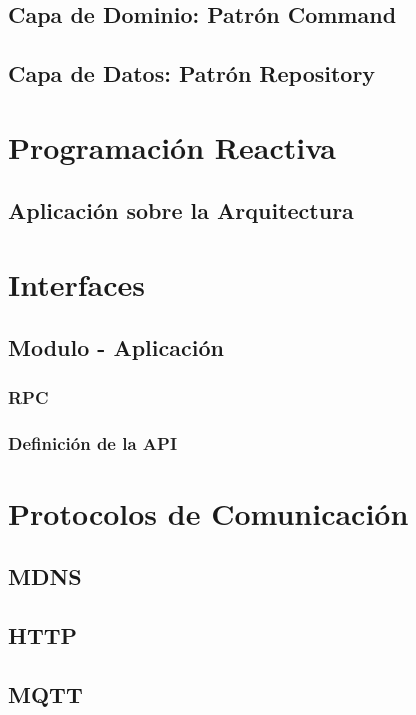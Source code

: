 \subsection{Capa de Dominio: Patrón Command}
\subsection{Capa de Datos: Patrón Repository}

\section{Programación Reactiva}
\subsection{Aplicación sobre la Arquitectura}

\section{Interfaces}
\subsection{Modulo - Aplicación}
\subsubsection{RPC}
\subsubsection{Definición de la API}

\section{Protocolos de Comunicación}
\subsection{MDNS}
\subsection{HTTP}
\subsection{MQTT}

